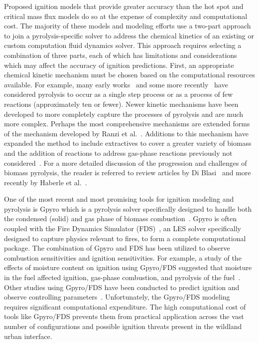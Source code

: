     Proposed ignition models that provide greater accuracy than the hot spot and critical mass flux models do so at the expense of complexity and computational cost. The majority of these models and modeling efforts use a two-part approach to join a pyrolysis-specific solver to address the chemical kinetics of an existing or custom computation fluid dynamics solver. This approach requires selecting a combination of three parts, each of which has limitations and considerations which may affect the accuracy of ignition predictions. First, an appropriate chemical kinetic mechanism must be chosen based on the computational resources available. For example, many early works~\cite{DiBlasi1996} and some more recently~\cite{Ding2015, Torero2020} have considered pyrolysis to occur as a single step process or as a process of few reactions (approximately ten or fewer). Newer kinetic mechanisms have been developed to more completely capture the processes of pyrolysis and are much more complex. Perhaps the most comprehensive mechanisms are extended forms of the mechanism developed by Ranzi et al.~\cite{Ranzi2008}. Additions to this mechanism have expanded the method to include extractives to cover a greater variety of biomass~\cite{Debiagi2015} and the addition of reactions to address gas-phase reactions previously not considered~\cite{Dhahak2019}. For a more detailed discussion of the progression and challenges of biomass pyrolysis, the reader is referred to review articles by Di Blasi~\cite{DIBLASI199371} and more recently by Haberle et al.~\cite{Haberle2017}. 
    
   One of the most recent and most promising tools for ignition modeling and pyrolysis is Gpyro which is a pyrolysis solver specifically designed to handle both the condensed (solid) and gas phase of biomass combustion~\cite{Lautenberger2009a}. Gpyro is often coupled with the Fire Dynamics Simulator (FDS)~\cite{FDSManual}, an LES solver specifically designed to capture physics relevant to fires, to form a complete computational package. The combination of Gpyro and FDS has been utilized to observe combustion sensitivities and ignition sensitivities. For example, a study of the effects of moisture content on ignition using Gpyro/FDS suggested that moisture in the fuel affected ignition, gas-phase combustion, and pyrolysis of the fuel~\cite{Yashwanth2016}. Other studies using Gpyro/FDS have been conducted to predict ignition and observe controlling parameters~\cite{Shotorban2018, Fernandez-Pello2015, Lautenberger2009}. Unfortunately, the Gpyro/FDS modeling requires significant computational expenditure. The high computational cost of tools like Gpyro/FDS prevents them from practical application across the vast number of configurations and possible ignition threats present in the wildland urban interface.
    
